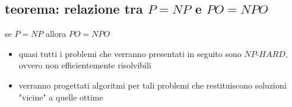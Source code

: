 \subsection*{teorema: relazione tra $P=NP$ e $PO=NPO$} 
\begin{flushleft}
	se $P=NP$ allora $PO=NPO$
	\begin{itemize}
		\item quasi tutti i problemi che verranno presentati in seguito sono $NP\text{-}HARD$, ovvero non efficientemente risolvibili
		\item verranno progettati algoritmi per tali problemi che restituiscono soluzioni "vicine" a quelle ottime
	\end{itemize}
\end{flushleft}

\newpage
